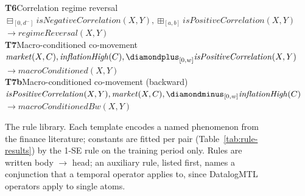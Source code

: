 \begin{figure}[t]
{\begin{minipage}{0.95\textwidth}
\textbf{T6}\quad Correlation regime reversal~\cite{ang2002regimeshifts}\\
\hspace*{1.5em}\mbox{$\boxminus_{[0, d^{-}]}\mathit{isNegativeCorrelation}(X,Y), \boxplus_{[a,b]}\mathit{isPositiveCorrelation}(X,Y)$}\\
\hspace*{1.5em}\hspace*{3em}\mbox{$\to \mathit{regimeReversal}(X,Y)$}\\[5pt]
\textbf{T7}\quad Macro-conditioned co-movement~\cite{bekaert2013risk}\hspace{1em plus 1fill}{\footnotesize (fitted constants: $w$)}\\
\hspace*{1.5em}\mbox{$\mathit{market}(X,C), \mathit{inflationHigh}(C), \diamondplus_{[0,w]} \mathit{isPositiveCorrelation}(X,Y)$}\\
\hspace*{1.5em}\hspace*{3em}\mbox{$\to \mathit{macroConditioned}(X,Y)$}\\[5pt]
\textbf{T7b}\quad Macro-conditioned co-movement (backward)~\cite{bekaert2013risk}\hspace{1em plus 1fill}{\footnotesize (fitted constants: $w$)}\\
\hspace*{1.5em}\mbox{$\mathit{isPositiveCorrelation}(X,Y), \mathit{market}(X,C), \diamondminus_{[0,w]} \mathit{inflationHigh}(C)$}\\
\hspace*{1.5em}\hspace*{3em}\mbox{$\to \mathit{macroConditionedBw}(X,Y)$}
\end{minipage}}
\caption{The rule library. Each template encodes a named phenomenon from the finance literature; constants are fitted per pair (Table~\ref{tab:rule-results}) by the 1-SE rule on the training period only. Rules are written body $\to$ head; an auxiliary rule, listed first, names a conjunction that a temporal operator applies to, since DatalogMTL operators apply to single atoms.}
\label{fig:rule-library}
\end{figure}
